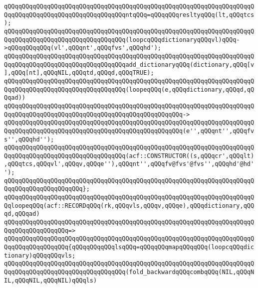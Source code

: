 \newline
\verb|qQQqqQQqqQQqqQQqqQQqqQQqqQQqqQQqqQQqqQQqqQQqqQQqqQQqqQQqqQQqqQQqqQQqqQQqqQQqqQQqqQQqqQQqqQQqqQQqqQQqqQQqntqQQq=qQQqqQQqresltyqQQq(lt,qQQqtcs);|\newline
\newline
\verb|qQQqqQQqqQQqqQQqqQQqqQQqqQQqqQQqqQQqqQQqqQQqqQQqqQQqqQQqqQQqqQQqqQQqqQQqqQQqqQQqqQQqqQQqqQQqqQQqqQQqqQQq(loopcqQQqdictionaryqQQqvl)qQQq->qQQqqQQqqQQq(vl',qQQqnt',qQQqfvs',qQQqhd');|\newline
\newline
\verb|qQQqqQQqqQQqqQQqqQQqqQQqqQQqqQQqqQQqqQQqqQQqqQQqqQQqqQQqqQQqqQQqqQQqqQQqqQQqqQQqqQQqqQQqqQQqqQQqqQQqqQQqadd_dictionaryqQQq(dictionary,qQQq[v],qQQq[nt],qQQqNIL,qQQqtd,qQQqd,qQQqTRUE);|\newline
\newline
\verb|qQQqqQQqqQQqqQQqqQQqqQQqqQQqqQQqqQQqqQQqqQQqqQQqqQQqqQQqqQQqqQQqqQQqqQQqqQQqqQQqqQQqqQQqqQQqqQQqqQQqqQQq(loopeqQQq(e,qQQqdictionary,qQQqd,qQQqad))|\newline
\verb|qQQqqQQqqQQqqQQqqQQqqQQqqQQqqQQqqQQqqQQqqQQqqQQqqQQqqQQqqQQqqQQqqQQqqQQqqQQqqQQqqQQqqQQqqQQqqQQqqQQqqQQqqQQqqQQqqQQqqQQq->|\newline
\verb|qQQqqQQqqQQqqQQqqQQqqQQqqQQqqQQqqQQqqQQqqQQqqQQqqQQqqQQqqQQqqQQqqQQqqQQqqQQqqQQqqQQqqQQqqQQqqQQqqQQqqQQqqQQqqQQqqQQqqQQq(e'',qQQqnt'',qQQqfvs'',qQQqhd'');|\newline
\newline
\verb|qQQqqQQqqQQqqQQqqQQqqQQqqQQqqQQqqQQqqQQqqQQqqQQqqQQqqQQqqQQqqQQqqQQqqQQqqQQqqQQqqQQqqQQqqQQqqQQqqQQqqQQq(acf::CONSTRUCTOR((s,qQQqcr',qQQqlt),qQQqtcs,qQQqvl',qQQqv,qQQqe''),qQQqnt'',qQQqfv@fvs'@fvs'',qQQqhd'@hd'');|\newline
\verb|qQQqqQQqqQQqqQQqqQQqqQQqqQQqqQQqqQQqqQQqqQQqqQQqqQQqqQQqqQQqqQQqqQQqqQQqqQQqqQQqqQQqqQQqqQQq};|\newline
\newline
\verb|qQQqqQQqqQQqqQQqqQQqqQQqqQQqqQQqqQQqqQQqqQQqqQQqqQQqqQQqqQQqqQQqqQQqqQQqloopeqQQq(acf::RECORDqQQq(rk,qQQqvls,qQQqv,qQQqe),qQQqdictionary,qQQqd,qQQqad)|\newline
\verb|qQQqqQQqqQQqqQQqqQQqqQQqqQQqqQQqqQQqqQQqqQQqqQQqqQQqqQQqqQQqqQQqqQQqqQQqqQQqqQQqqQQqqQQq=>|\newline
\verb|qQQqqQQqqQQqqQQqqQQqqQQqqQQqqQQqqQQqqQQqqQQqqQQqqQQqqQQqqQQqqQQqqQQqqQQqqQQqqQQqqQQqqQQq{qQQqqQQqqQQqlsqQQq=qQQqqQQqmapqQQqqQQq(loopcqQQqdictionary)qQQqqQQqvls;|\newline
\newline
\verb|qQQqqQQqqQQqqQQqqQQqqQQqqQQqqQQqqQQqqQQqqQQqqQQqqQQqqQQqqQQqqQQqqQQqqQQqqQQqqQQqqQQqqQQqqQQqqQQqqQQqqQQq(fold_backwardqQQqcombqQQq(NIL,qQQqNIL,qQQqNIL,qQQqNIL)qQQqls)|\newline
